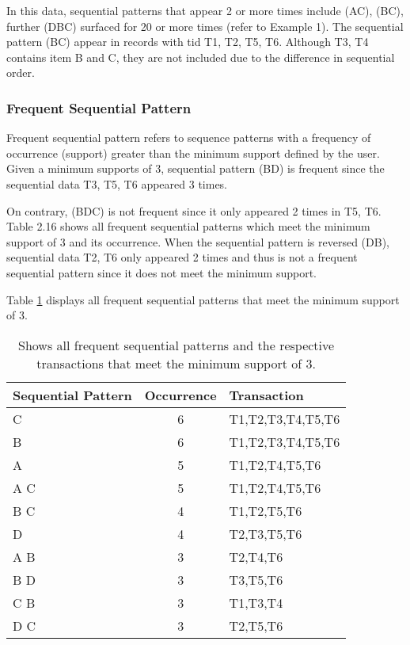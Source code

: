 In this data, sequential patterns that appear 2 or more times include (AC), (BC), further (DBC) surfaced for 20 or more times (refer to Example 1). The sequential pattern (BC) appear in records with tid T1, T2, T5, T6. Although T3, T4 contains item B and C, they are not included due to the difference in sequential order. 


\subsubsection*{Frequent Sequential Pattern}

Frequent sequential pattern refers to sequence patterns with a frequency of occurrence (support)  greater than the minimum support defined by the user. Given a minimum supports of 3, sequential pattern (BD) is frequent since the sequential data T3, T5, T6 appeared 3 times. 

On contrary, (BDC) is not frequent since it only appeared 2 times in T5, T6. Table 2.16 shows all  frequent sequential patterns which meet the minimum support of 3 and its occurrence. When  the sequential pattern is reversed (DB), sequential data T2, T6 only appeared 2 times and thus is not a frequent sequential pattern since it does not meet the minimum support.  

Table \ref{tbl:freqSeq} displays all frequent sequential patterns that meet the minimum support of 3. 

\begin{table}[htbp]
\begin{center}
\caption{Shows all frequent sequential patterns and the respective transactions that meet the minimum support of 3. \label{tbl:freqSeq}}
\begin{tabular}{lcl}
\hline
Sequential Pattern & Occurrence & Transaction \\
\hline
C   & 6 & T1,T2,T3,T4,T5,T6\\
B   & 6 & T1,T2,T3,T4,T5,T6\\
A   & 5 & T1,T2,T4,T5,T6 \\
A C & 5 & T1,T2,T4,T5,T6 \\
B C & 4 & T1,T2,T5,T6 \\
D   & 4 & T2,T3,T5,T6\\
A B & 3 & T2,T4,T6\\
B D & 3 & T3,T5,T6\\
C B & 3 & T1,T3,T4\\
D C & 3 & T2,T5,T6\\
\hline
\end{tabular} 
\end{center}
\end{table} 

